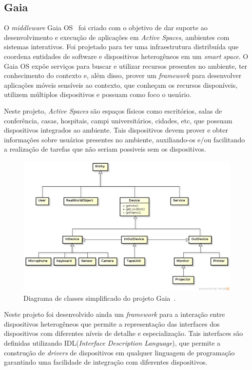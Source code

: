 \subsection{Gaia}
O \emph{middleware} Gaia OS~\cite{gaia2002} foi criado com o objetivo de dar suporte ao desenvolvimento e execução de aplicações em \emph{Active Spaces}, ambientes com sistemas interativos. Foi projetado para ter uma infraestrutura distribuída que coordena entidades de software e dispositivos heterogêneos em um \emph{smart space}. O Gaia OS expõe serviços para buscar e utilizar recursos presentes no ambiente, ter conhecimento do contexto e, além disso, prover um \emph{framework} para desenvolver aplicações móveis sensíveis ao contexto, que conheçam os recursos disponíveis, utilizem múltiplos dispositivos e possuam como foco o usuário.

Neste projeto, \emph{Active Spaces} são espaços físicos como escritórios, salas de conferência, casas, hospitais, campi universitários, cidades, etc, que possuam dispositivos integrados ao ambiente. Tais dispositivos devem prover e obter informações sobre usuários presentes no ambiente, auxiliando-os e/ou facilitando a realização de tarefas que não seriam possiveis sem os dispositivos.

\begin{figure}[ht]
\center
\includegraphics[scale=0.5]{imagens/gaia-devices}
\caption{Diagrama de classes simplificado do projeto Gaia~\cite{gaiaDevices}.}
\label{fig:gaiaClassDiagram}
\end{figure}

Neste projeto foi desenvolvido ainda um \emph{framework} para a interação entre dispositivos heterogêneos que permite a representação das interfaces dos dispositivos com diferentes níveis de detalhe e especialização. Tais interfaces são definidas utilizando IDL(\emph{Interface Description Language}), que permite a construção de \emph{drivers} de dispositivos em qualquer linguagem de programação garantindo uma facilidade de integração com diferentes dispositivos.


